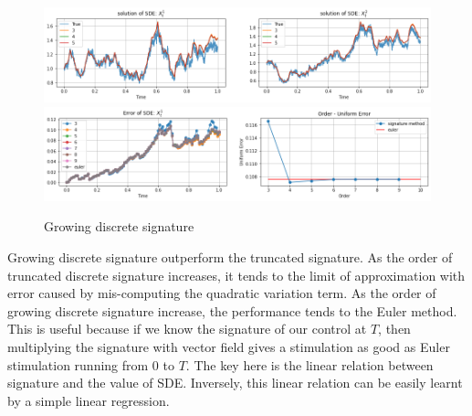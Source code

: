 \documentclass[12pt]{report}
\theoremstyle{definition}
\theoremstyle{remark}
\begin{document}
\begin{figure}[H]
    \centering
    \includegraphics[width=\textwidth]{figs/sde4.png}
    \includegraphics[width=\textwidth]{figs/sde5.png}
    \caption{Growing discrete signature}
\end{figure}
Growing discrete signature outperform the truncated signature. As the order of truncated discrete signature increases, it tends to the limit of approximation with error caused by mis-computing the quadratic variation term. As the order of growing discrete signature increase, the performance tends to the Euler method. This is useful because if we know the signature of our control at $T$, then multiplying the signature with vector field gives a stimulation as good as Euler stimulation running from $0$ to $T$. The key here is the linear relation between signature and the value of SDE. Inversely, this linear relation can be easily learnt by a simple linear regression.
\end{document}
